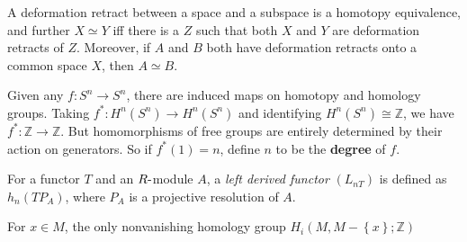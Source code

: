 \begin{remark}

A deformation retract between a space and a subspace is a homotopy
equivalence, and further \(X\simeq Y\) iff there is a \(Z\) such that
both \(X\) and \(Y\) are deformation retracts of \(Z\). Moreover, if
\(A\) and \(B\) both have deformation retracts onto a common space
\(X\), then \(A \simeq B\).

\end{remark}

\begin{definition}

Given any \(f: S^n \to S^n\), there are induced maps on homotopy and
homology groups. Taking \(f^*: H^n(S^n) \to H^n(S^n)\) and identifying
\(H^n(S^n) \cong {\mathbb{Z}}\), we have
\(f^*: {\mathbb{Z}}\to{\mathbb{Z}}\). But homomorphisms of free groups
are entirely determined by their action on generators. So if
\(f^*(1) = n\), define \(n\) to be the \textbf{degree} of \(f\).

\end{definition}

\begin{definition}

For a functor \(T\) and an \(R{\hbox{-}}\)module \(A\), a \emph{left
derived functor} \((L_{nT})\) is defined as \(h_{n}(TP_{A})\), where
\(P_{A}\) is a projective resolution of \(A\).

\end{definition}

\begin{definition}

For \(x\in M\), the only nonvanishing homology group
\(H_{i}(M, M - \left\{{x}\right\}; {\mathbb{Z}})\)

\end{definition}

\begin{definition}

\end{definition}


\begin{definition}

\end{definition}


\begin{definition}

\end{definition}

